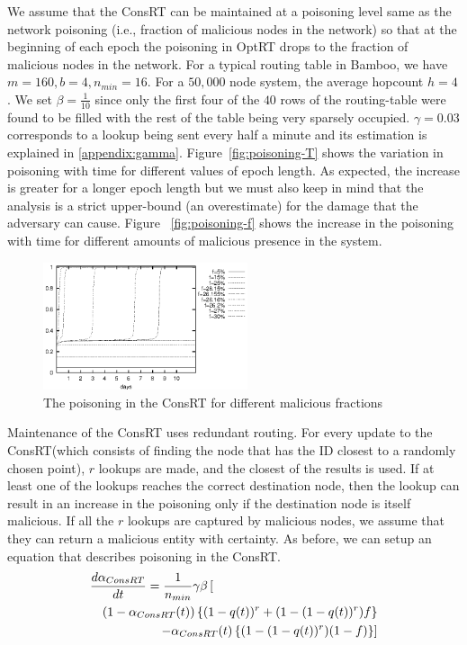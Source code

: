 \documentclass[10pt,twocolumn]{article}
\newcommand{\dd}[2]{\ensuremath{\frac{d #1}{d #2}}}
\newcommand{\pow}[2]{\ensuremath{#1}^{#2}}
\newcommand{\PRT}{OptRT\xspace}
\newcommand{\CRT}{ConsRT\xspace}
\newcommand{\fullCRT}{Constrained Routing Table\xspace}
\begin{document}
We assume that the \CRT can be maintained at a poisoning level same as
the network poisoning (i.e., fraction of malicious nodes in the network)
so that at the beginning of each epoch the poisoning in \PRT drops to
the fraction of malicious nodes in the network. For a typical routing
table in Bamboo, we have $m=160, b=4, n_{min}=16$. For a $50,000$ node
system, the average hopcount $h=4$. We set $\beta=\frac{1}{10}$ since
only the first four of the $40$ rows of the routing-table were found to
be filled with the rest of the table being very sparsely
occupied. $\gamma=0.03$ corresponds to a lookup being sent every half a
minute and its estimation is explained in \ref{appendix:gamma}.
Figure~\ref{fig:poisoning-T} shows the variation in poisoning with time
for different values of epoch length. As expected, the increase is
greater for a longer epoch length but we must also keep in mind that the
analysis is a strict upper-bound (an overestimate) for the damage that
the adversary can cause. Figure ~\ref{fig:poisoning-f} shows the
increase in the poisoning with time for different amounts of malicious
presence in the system.
\begin{figure}
\centerline{\includegraphics[width=6cm]{graphs/equations/poisoning-CRT}}
\caption{The poisoning in the \CRT for different malicious fractions}
\label{fig:poisoning-CRT}
\end{figure}

\SubSection{Poisoning in the \fullCRT}
Maintenance of the \CRT uses redundant routing. For every update to the
\CRT (which consists of finding the node that has the ID closest to a
randomly chosen point), $r$ lookups are made, and the closest of the
results is used. If at least one of the lookups reaches the correct
destination node, then the lookup can result in an increase in the
poisoning only if the destination node is itself malicious. If all the
$r$ lookups are captured by malicious nodes, we assume that they can
return a malicious entity with certainty. As before, we can setup an
equation that describes poisoning in the \CRT.
\begin{eqnarray}
\lefteqn{\dd{\alpha_{\CRT}}{t}=\frac{1}{n_{min}}\gamma \beta \left[ \right.} \nonumber\\
&&(1-\alpha_{\CRT}(t)) \left\{\pow{(1-q(t))}{r}+ (1-\pow{(1-q(t))}{r})f\right\}\nonumber \\
&& \left. - \alpha_{\CRT}(t)\left\{ (1-\pow{(1-q(t))}{r})(1-f) \right\} \right]
\label{eqn:CRT-rate}
\end{eqnarray}
\end{document}
